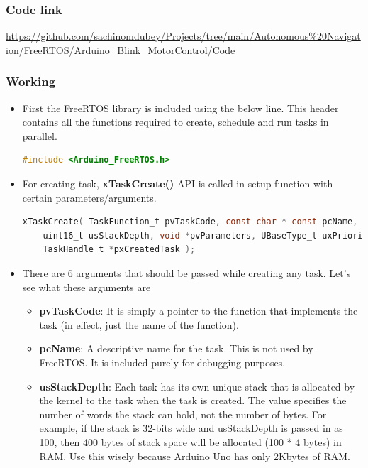 \subsubsection{Code link} \label{Code_link_FreeRTOS_Arduino}
\begin{tcolorbox}
\url{https://github.com/sachinomdubey/Projects/tree/main/Autonomous\%20Navigation/FreeRTOS/Arduino_Blink_MotorControl/Code}
\end{tcolorbox}

\subsubsection{Working}
\begin{itemize}
    \item First the FreeRTOS library is included using the below line. This header contains all the functions required to create, schedule and run tasks in parallel.
    \begin{lstlisting}[language=C]
    #include <Arduino_FreeRTOS.h>
    \end{lstlisting}
    \item For creating task, \textbf{xTaskCreate()} API is called in setup function with certain parameters/arguments.
    \begin{lstlisting}[language=C]
    xTaskCreate( TaskFunction_t pvTaskCode, const char * const pcName,
    uint16_t usStackDepth, void *pvParameters, UBaseType_t uxPriority,
    TaskHandle_t *pxCreatedTask );
    \end{lstlisting}
    \item There are 6 arguments that should be passed while creating any task. Let’s see what these arguments are
    \begin{itemize}
        \item \textbf{pvTaskCode}: It is simply a pointer to the function that implements the task (in effect, just the name of the function).
        \item \textbf{pcName}: A descriptive name for the task. This is not used by FreeRTOS. It is included purely for debugging purposes.
        \item \textbf{usStackDepth}: Each task has its own unique stack that is allocated by the kernel to the task when the task is created. The value specifies the number of words the stack can hold, not the number of bytes. For example, if the stack is 32-bits wide and usStackDepth is passed in as 100, then 400 bytes of stack space will be allocated (100 * 4 bytes) in RAM. Use this wisely because Arduino Uno has only 2Kbytes of RAM.

\end{itemize}
\end{itemize}
